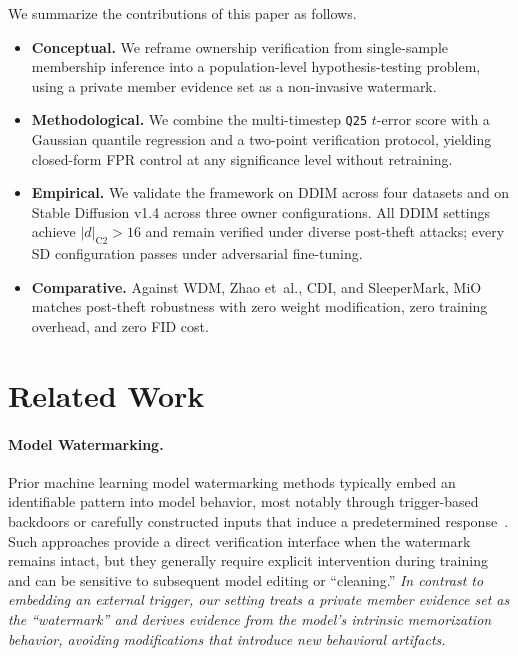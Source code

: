 \documentclass{article}
\begin{document}
We summarize the contributions of this paper as follows.
\begin{itemize}
    \item \textbf{Conceptual.} We reframe ownership verification from single-sample membership inference into a population-level hypothesis-testing problem, using a private member evidence set as a non-invasive watermark.

    \item \textbf{Methodological.} We combine the multi-timestep \texttt{Q25} $t$-error score with a Gaussian quantile regression and a two-point verification protocol, yielding closed-form FPR control at any significance level without retraining.
    
    \item \textbf{Empirical.} We validate the framework on DDIM across four datasets 
    and on Stable Diffusion v1.4 across three owner configurations. All DDIM settings 
    achieve $|d|_{\text{C2}} > 16$ and remain verified under diverse post-theft 
    attacks; every SD configuration passes under adversarial fine-tuning.
    
    \item \textbf{Comparative.} Against WDM, Zhao et~al., CDI, and SleeperMark, 
    MiO matches post-theft robustness with zero weight modification, zero training 
    overhead, and zero FID cost.
\end{itemize}



\section{Related Work}
\label{sec:related}

\paragraph{Model Watermarking.}
Prior machine learning model watermarking methods typically embed an identifiable pattern into model behavior, most notably through trigger-based backdoors or carefully constructed inputs that induce a predetermined response~\citep{adi2018turning,zhang2018protecting,fernandez2023stable,wen2023tree}.
Such approaches provide a direct verification interface when the watermark remains intact, but they generally require explicit intervention during training and can be sensitive to subsequent model editing or ``cleaning.''
\textit{In contrast to embedding an external trigger, our setting treats a private member evidence set as the ``watermark'' and derives evidence from the model's intrinsic memorization behavior, avoiding modifications that introduce new behavioral artifacts.}
\end{document}
